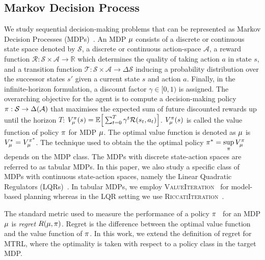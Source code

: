 \subsection{Markov Decision Process}\label{sec:mdp}
We study sequential decision-making problems that can be represented as Markov Decision Processes (MDPs)~\citep{puterman2014markov}. An MDP $\mu$ consists of a discrete or continuous state space denoted by $\mathcal{S}$, a discrete or continuous action-space $\mathcal{A}$, a reward function $\mathcal{R} : \mathcal{S} \times \mathcal{A} \rightarrow \mathbb{R}$ which determines the quality of taking action $a$ in state $s$, and a transition function $\mathcal{T} : \mathcal{S} \times \mathcal{A} \rightarrow \Delta\mathcal{S}$ inducing a probability distribution over the successor states $s'$ given a current state $s$ and action $a$. Finally, in the infinite-horizon formulation, a discount factor $\gamma \in [0, 1)$ is assigned. The overarching objective for the agent is to compute a decision-making policy $\pi : \mathcal{S} \rightarrow \Delta(\mathcal{A})$ that maximises the expected sum of future discounted rewards up until the horizon $T$: $V_\mu^{\pi}(s) = \mathbb{E}\Big[\sum_{t=0}^T \gamma^t \mathcal{R}(s_t, a_t)\Big]$. $V_\mu^{\pi}(s)$ is called the value function of policy $\pi$ for MDP $\mu$. The optimal value function is denoted as $\mu$ is $V_\mu^{*} = V_\mu^{\pi^{*}}$. The technique used to obtain the the optimal policy $\pi^{*} = \underset{\pi}{\sup} \, V_\mu^{\pi}$ depends on the MDP class. The MDPs with discrete state-action spaces are referred to as tabular MDPs. In this paper, we also study a specific class of MDPs with continuous state-action spaces, namely the Linear Quadratic Regulators (LQRs)~\citep{kalman1960new}. In tabular MDPs, we employ \textsc{ValueIteration}~\citep{puterman2014markov} for model-based planning whereas in the LQR setting we use \textsc{RiccatiIteration}~\citep{willems1971least}. 

The standard metric used to measure the performance of a policy $\pi$~\citep{bell1982regret} for an MDP $\mu$ is \textit{regret} $R(\mu, \pi)$. Regret is the difference between the optimal value function and the value function of $\pi$. In this work, we extend the definition of regret for MTRL, where the optimality is taken with respect to a policy class in the target MDP.



